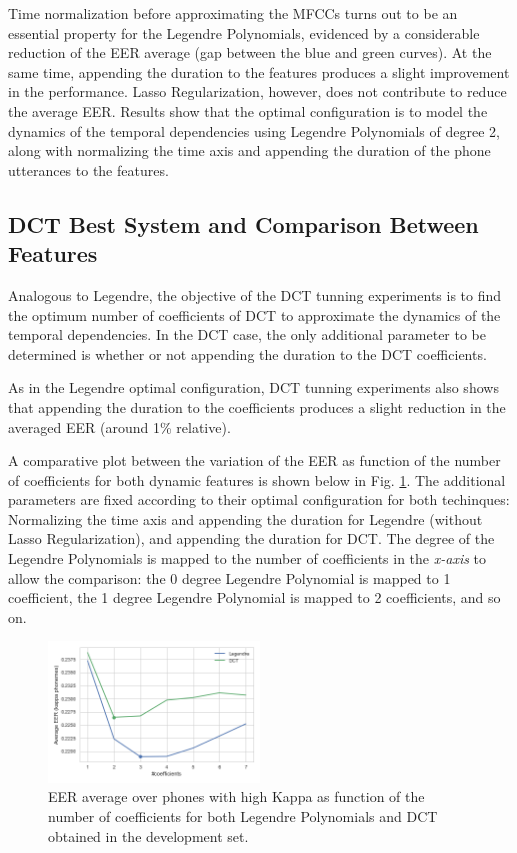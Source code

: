 Time normalization before approximating the
MFCCs turns out to be an essential property for the Legendre Polynomials, evidenced by a
considerable reduction of the EER average (gap between the blue and green curves). At the same
time, appending the duration to the features produces a slight improvement in the performance.
Lasso Regularization, however, does not contribute to reduce the average EER.
Results show that the optimal configuration is to model the dynamics of the temporal dependencies
using Legendre Polynomials of degree 2,
along with normalizing the time axis and appending the duration of the
phone utterances to the features.

\subsection{DCT Best System and Comparison Between Features}

Analogous to Legendre, the objective of the DCT tunning experiments is to find the optimum
number of coefficients of DCT to approximate the dynamics of the temporal dependencies.
In the DCT case, the only additional parameter to be determined is whether or not appending the
duration to the DCT coefficients.

As in the Legendre optimal configuration, DCT tunning experiments also shows that appending the
duration to the coefficients produces a slight reduction in the averaged EER (around 1\%
relative).

A comparative plot between the variation of the EER as function of the number of coefficients
for both dynamic features is shown below in Fig. \ref{fig:legendreVsDCT}.
The additional parameters are fixed according to their optimal configuration
for both techinques:
Normalizing the time axis and appending the duration for Legendre (without Lasso Regularization),
and appending the duration for DCT. The degree of the Legendre Polynomials is mapped to
the number of coefficients in the \textit{x-axis} to allow the comparison:
the 0 degree Legendre Polynomial is mapped to 1 coefficient, the 1 degree Legendre Polynomial
is mapped to 2 coefficients, and so on.

\begin{figure}[H]
	\centering
	\includegraphics[width=0.5\textwidth]{files/figures/results/legendre-dct/legendre-dct-coefficients.png}
	\caption{EER average over phones with high Kappa as function of the number of coefficients
	for both Legendre Polynomials and DCT obtained in the development set.}
	\label{fig:legendreVsDCT}
\end{figure}

